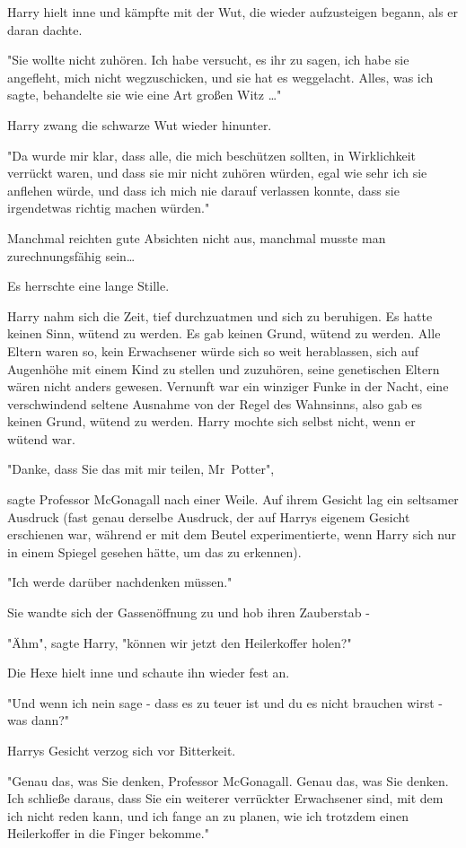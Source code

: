 {Harry hielt inne und kämpfte mit der Wut, die wieder aufzusteigen begann, als er daran dachte.

"Sie wollte nicht zuhören. Ich habe versucht, es ihr zu sagen, ich habe sie angefleht, mich nicht wegzuschicken, und sie hat es weggelacht. Alles, was ich sagte, behandelte sie wie eine Art großen Witz …"

Harry zwang die schwarze Wut wieder hinunter.

"Da wurde mir klar, dass alle, die mich beschützen sollten, in Wirklichkeit verrückt waren, und dass sie mir nicht zuhören würden, egal wie sehr ich sie anflehen würde, und dass ich mich nie darauf verlassen konnte, dass sie irgendetwas richtig machen würden."

Manchmal reichten gute Absichten nicht aus, manchmal musste man zurechnungsfähig sein…

Es herrschte eine lange Stille.

Harry nahm sich die Zeit, tief durchzuatmen und sich zu beruhigen. Es hatte keinen Sinn, wütend zu werden. Es gab keinen Grund, wütend zu werden. Alle Eltern waren so, kein Erwachsener würde sich so weit herablassen, sich auf Augenhöhe mit einem Kind zu stellen und zuzuhören, seine genetischen Eltern wären nicht anders gewesen. Vernunft war ein winziger Funke in der Nacht, eine verschwindend seltene Ausnahme von der Regel des Wahnsinns, also gab es keinen Grund, wütend zu werden. Harry mochte sich selbst nicht, wenn er wütend war.

"Danke, dass Sie das mit mir teilen, Mr~Potter",

sagte Professor McGonagall nach einer Weile. Auf ihrem Gesicht lag ein seltsamer Ausdruck (fast genau derselbe Ausdruck, der auf Harrys eigenem Gesicht erschienen war, während er mit dem Beutel experimentierte, wenn Harry sich nur in einem Spiegel gesehen hätte, um das zu erkennen).

"Ich werde darüber nachdenken müssen."

Sie wandte sich der Gassenöffnung zu und hob ihren Zauberstab -

"Ähm", sagte Harry, "können wir jetzt den Heilerkoffer holen?"

Die Hexe hielt inne und schaute ihn wieder fest an.

"Und wenn ich nein sage - dass es zu teuer ist und du es nicht brauchen wirst - was dann?"

Harrys Gesicht verzog sich vor Bitterkeit.

"Genau das, was Sie denken, Professor McGonagall. Genau das, was Sie denken. Ich schließe daraus, dass Sie ein weiterer verrückter Erwachsener sind, mit dem ich nicht reden kann, und ich fange an zu planen, wie ich trotzdem einen Heilerkoffer in die Finger bekomme."

}
